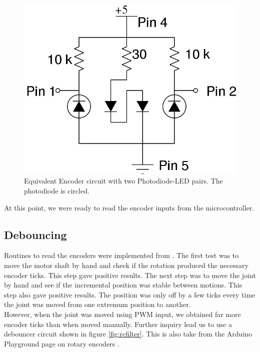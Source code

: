 \documentclass[10pt,a4paper]{article}
\begin{document}
\begin{figure}[h]
    \centering
    \includegraphics[scale=0.5]{EncoderCircuit.jpg}
    \caption{Equivalent Encoder circuit with two Photodiode-LED
      pairs. The photodiode is circled.}
    \label{fig:encoderCircuit}
\end{figure}

At this point, we were ready to read the encoder inputs from the
microcontroller. 

\subsection{Debouncing}

Routines to read the encoders were implemented from
\cite{ArduinoPlaygroundRE}.
The first test was to move the motor shaft by hand and check if the
rotation produced the necessary encoder ticks. This step gave positive
results. The next step was to move the joint by hand and see if the
incremental position was stable between motions. This step also gave
positive results. The position was only off by a few ticks every time
the joint was moved from one extremum position to another. \\

However, when the joint was moved using PWM input, we obtained far
more encoder ticks than when moved manually. Further inquiry lead us
to use a debouncer circuit shown in figure \ref{fig:rcfilter}. This is
also take from the Arduino Playground page on rotary encoders
\cite{ArduinoPlaygroundRE}.\\
\end{document}
